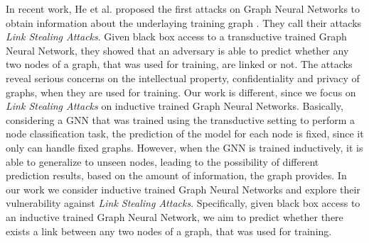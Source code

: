   In recent work, He et al. proposed the first attacks on Graph Neural Networks to obtain information about the underlaying training graph \cite{DBLP:journals/corr/abs-2005-02131}.
  They call their attacks \emph{Link Stealing Attacks}.
  Given black box access to a transductive trained Graph Neural Network, they showed that an adversary is able to predict whether any two nodes of a graph, that was used for training, are linked or not.
  The attacks reveal serious concerns on the intellectual property, confidentiality and privacy of graphs, when they are used for training.
  Our work is different, since we focus on \emph{Link Stealing Attacks} on inductive trained Graph Neural Networks.
  Basically, considering a GNN that was trained using the transductive setting to perform a node classification task, the prediction of the model for each node is fixed, since it only can handle fixed graphs.
  However, when the GNN is trained inductively, it is able to generalize to unseen nodes, leading to the possibility of different prediction results, based on the amount of information, the graph provides.
  In our work we consider inductive trained Graph Neural Networks and explore their vulnerability against \emph{Link Stealing Attacks}.
  Specifically, given black box access to an inductive trained Graph Neural Network, we aim to predict whether there exists a link between any two nodes of a graph, that was used for training.